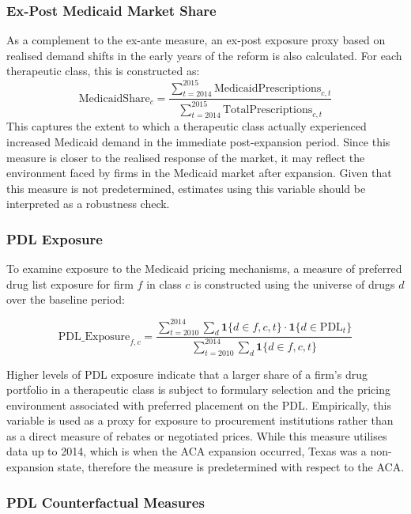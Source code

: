 \documentclass[12pt]{article}
\begin{document}
\subsubsection{Ex-Post Medicaid Market Share}

As a complement to the ex-ante measure, an ex-post exposure proxy based on realised demand shifts in the early years of the reform is also calculated. For each therapeutic class, this is constructed as:
\begin{equation}
\text{MedicaidShare}_{c}
=
\frac{
\sum_{t=2014}^{2015} \text{MedicaidPrescriptions}_{c,t}
}{
\sum_{t=2014}^{2015} \text{TotalPrescriptions}_{c,t}
}
\end{equation}
This captures the extent to which a therapeutic class actually experienced increased Medicaid demand in the immediate post-expansion period. Since this measure is closer to the realised response of the market, it may reflect the environment faced by firms in the Medicaid market after expansion. Given that this measure is not predetermined, estimates using this variable should be interpreted as a robustness check.

\subsubsection{PDL Exposure}

To examine exposure to the Medicaid pricing mechanisms, a measure of preferred drug list exposure for firm $f$ in class $c$ is constructed using the universe of drugs $d$ over the baseline period:

\begin{equation}
\text{PDL\_Exposure}_{f,c}
=
\frac{
\sum_{t=2010}^{2014} \sum_{d} \mathbf{1}\{d \in f, c, t\} \cdot \mathbf{1}\{d \in \text{PDL}_t\}
}{
\sum_{t=2010}^{2014} \sum_{d} \mathbf{1}\{d \in f, c, t\}
}
\end{equation}

Higher levels of PDL exposure indicate that a larger share of a firm's drug portfolio in a therapeutic class is subject to formulary selection and the pricing environment associated with preferred placement on the PDL. Empirically, this variable is used as a proxy for exposure to procurement institutions rather than as a direct measure of rebates or negotiated prices. While this measure utilises data up to 2014, which is when the ACA expansion occurred, Texas was a non-expansion state, therefore the measure is predetermined with respect to the ACA.

\subsubsection{PDL Counterfactual Measures}
\end{document}
